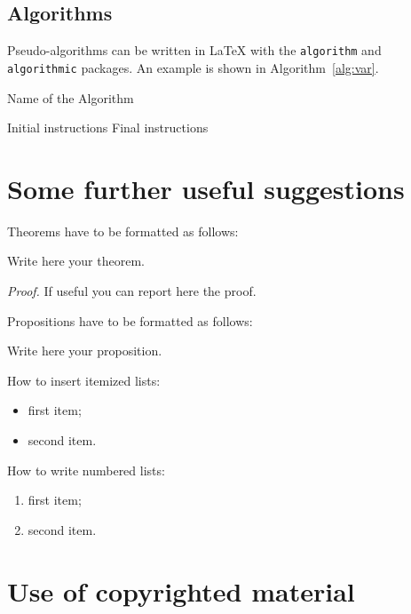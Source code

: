 \documentclass[11pt,a4paper]{article}
\begin{document}
\subsection{Algorithms}
\label{subsec:algorithms}

Pseudo-algorithms can be written in \LaTeX{} with the \texttt{algorithm} and \texttt{algorithmic} packages.
An example is shown in Algorithm~\ref{alg:var}.
\begin{algorithm}[H]
\label{alg:example}
\caption{Name of the Algorithm}
\label{alg:var}
\label{protocol1}
\begin{algorithmic}[1]
\STATE Initial instructions
\ENDIF
\ENDFOR
{}
\ENDWHILE
\STATE Final instructions
\end{algorithmic}
\end{algorithm} 

\section{Some further useful suggestions}

Theorems have to be formatted as follows:
\begin{theorem}
\label{a_theorem}
Write here your theorem. 
\end{theorem}
\textit{Proof.} If useful you can report here the proof.
\vspace{0.3cm} %

Propositions have to be formatted as follows:
\begin{proposition}
Write here your proposition.
\end{proposition}
\vspace{0.3cm} %

How to insert itemized lists:
\begin{itemize}
    \item first item;
    \item second item.
\end{itemize}
How to write numbered lists:
\begin{enumerate}
    \item first item;
    \item second item.
\end{enumerate}

\section{Use of copyrighted material}
\end{document}
